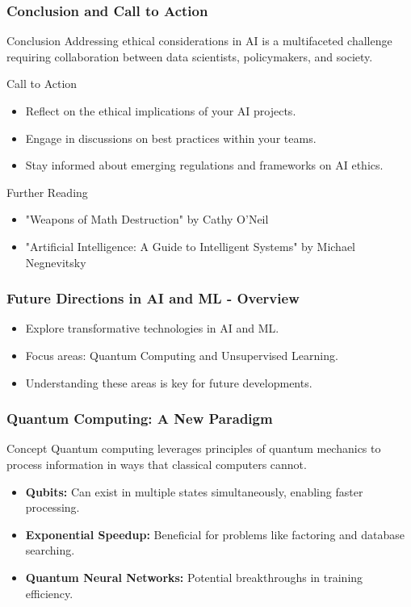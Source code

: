 \documentclass[aspectratio=169]{beamer}
\begin{document}
\begin{frame}[fragile]
    \frametitle{Conclusion and Call to Action}
    \begin{block}{Conclusion}
        Addressing ethical considerations in AI is a multifaceted challenge requiring collaboration between data scientists, policymakers, and society.
    \end{block}
    
    \begin{block}{Call to Action}
        \begin{itemize}
            \item Reflect on the ethical implications of your AI projects.
            \item Engage in discussions on best practices within your teams.
            \item Stay informed about emerging regulations and frameworks on AI ethics.
        \end{itemize}
    \end{block}
    
    \begin{block}{Further Reading}
        \begin{itemize}
            \item "Weapons of Math Destruction" by Cathy O'Neil
            \item "Artificial Intelligence: A Guide to Intelligent Systems" by Michael Negnevitsky
        \end{itemize}
    \end{block}
\end{frame}

\begin{frame}[fragile]
    \frametitle{Future Directions in AI and ML - Overview}
    \begin{itemize}
        \item Explore transformative technologies in AI and ML.
        \item Focus areas: Quantum Computing and Unsupervised Learning.
        \item Understanding these areas is key for future developments.
    \end{itemize}
\end{frame}

\begin{frame}[fragile]
    \frametitle{Quantum Computing: A New Paradigm}
    \begin{block}{Concept}
        Quantum computing leverages principles of quantum mechanics to process information in ways that classical computers cannot.
    \end{block}
    
    \begin{itemize}
        \item \textbf{Qubits:} Can exist in multiple states simultaneously, enabling faster processing.
        \item \textbf{Exponential Speedup:} Beneficial for problems like factoring and database searching.
        \item \textbf{Quantum Neural Networks:} Potential breakthroughs in training efficiency.
    \end{itemize}
\end{frame}
\end{document}
